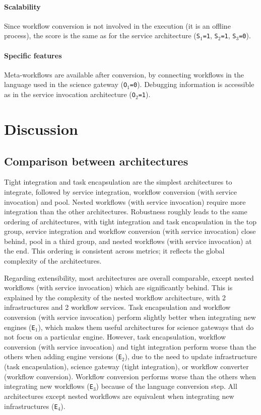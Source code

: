 \documentclass[preprint,3p,twocolumn]{elsarticle}
\begin{document}
\paragraph{Scalability}  Since workflow conversion is not involved in
the execution (it is an offline process), the score is the same as for the
service architecture (\texttt{S$_1$=1},
\texttt{S$_2$=1}, \texttt{S$_3$=0}).

\paragraph{Specific features} Meta-workflows are available after
conversion, by connecting workflows in the language used in the
science gateway (\texttt{O$_1$=0}).  Debugging information is accessible
as in the service invocation architecture (\texttt{O$_2$=1}).

\section{Discussion}

\subsection{Comparison between architectures}

Tight integration and task encapsulation are the simplest
architectures to integrate, followed by service integration, workflow conversion (with
service invocation) and pool. Nested workflows (with service
invocation) require more integration than the other
architectures. Robustness roughly leads to the same ordering of
architectures, with tight integration and task encapsulation in the top
group, service integration and workflow conversion (with service
invocation) close behind, pool in a third group, and nested workflows
(with service invocation) at the end. This ordering is consistent
across metrics; it reflects the global complexity of the
architectures.

Regarding extensibility, most architectures are overall comparable,
except nested workflows (with service invocation) which are
significantly behind. This is explained by the complexity of the
nested workflow architecture, with 2 infrastructures and 2 workflow
services. Task encapsulation and workflow conversion (with service
invocation) perform slightly better when integrating new engines
(\texttt{E$_1$}), which makes them useful architectures for science
gateways that do not focus on a particular engine.  However, task encapsulation, workflow conversion (with
service invocation) and tight integration perform worse than the
others when adding engine versions (\texttt{E$_2$}), due to the need
to update infrastructure (task encapsulation), science gateway (tight
integration), or workflow converter (workflow conversion). Workflow conversion
performs worse than the others when integrating new workflows
(\texttt{E$_3$}) because of the language conversion step. All
architectures except nested workflows are equivalent when integrating
new infrastructures (\texttt{E$_4$}).
\end{document}
